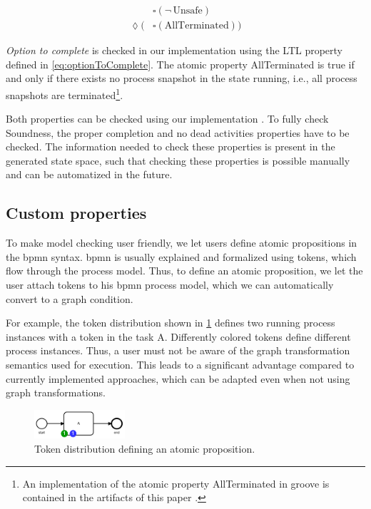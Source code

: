\documentclass[adraft, copyright, creativecommons]{eptcs} %
\begin{document}
\begin{align}
    & \square (\neg \,\text{Unsafe}) \label{eq:safeness} \\
    \lozenge (& \square(\text{AllTerminated})) \label{eq:optionToComplete}
\end{align}

\emph{Option to complete} is checked in our implementation using the LTL property defined in \eqref{eq:optionToComplete}.
The atomic property \textsf{AllTerminated} is true if and only if there exists no process snapshot in the state running, i.e., all process snapshots are terminated\footnote{An implementation of the atomic property \textsf{AllTerminated} in groove is contained in the artifacts of this paper \cite{timkrauterArtifactsTERMGRAPH2022}.}.

Both properties can be checked using our implementation \cite{timkrauterArtifactsTERMGRAPH2022}.
To fully check Soundness, the proper completion and no dead activities properties have to be checked.
The information needed to check these properties is present in the generated state space, such that checking these properties is possible manually and can be automatized in the future.
\subsection{Custom properties}

To make model checking user friendly, we let users define atomic propositions in the \gls*{bpmn} syntax.
\gls*{bpmn} is usually explained and formalized using tokens, which flow through the process model.
Thus, to define an atomic proposition, we let the user attach tokens to his \gls*{bpmn} process model, which we can automatically convert to a graph condition.

For example, the token distribution shown in \cref{fig:atomicProposition} defines two running process instances with a token in the task A.
Differently colored tokens define different process instances.
Thus, a user must not be aware of the graph transformation semantics used for execution.
This leads to a significant advantage compared to currently implemented approaches, which can be adapted even when not using graph transformations.

\begin{figure}[h]
    \centering
    \includegraphics[width=0.3\textwidth]{images/bpmn_semantics-atomicProp.pdf}
    \caption{Token distribution defining an atomic proposition.}
    \label{fig:atomicProposition}
\end{figure}
\end{document}
